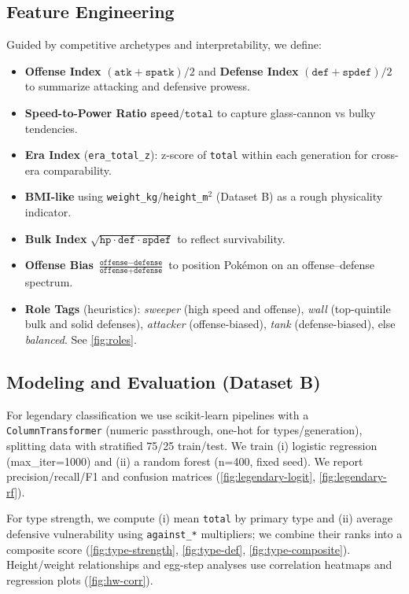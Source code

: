 \documentclass[11pt]{article}
\begin{document}
\subsection*{Feature Engineering}
Guided by competitive archetypes and interpretability, we define:
\begin{itemize}[leftmargin=*]
  \item \textbf{Offense Index} \((\texttt{atk}+\texttt{spatk})/2\) and \textbf{Defense Index} \((\texttt{def}+\texttt{spdef})/2\) to summarize attacking and defensive prowess.
  \item \textbf{Speed-to-Power Ratio} \(\texttt{speed}/\texttt{total}\) to capture glass-cannon vs bulky tendencies.
  \item \textbf{Era Index} (\texttt{era\_total\_z}): z-score of \texttt{total} within each generation for cross-era comparability.
  \item \textbf{BMI-like} using \texttt{weight\_kg}/\texttt{height\_m}\(^2\) (Dataset B) as a rough physicality indicator.
  \item \textbf{Bulk Index} \(\sqrt{\texttt{hp}\cdot\texttt{def}\cdot\texttt{spdef}}\) to reflect survivability.
  \item \textbf{Offense Bias} \(\frac{\texttt{offense}-\texttt{defense}}{\texttt{offense}+\texttt{defense}}\) to position Pokémon on an offense--defense spectrum.
  \item \textbf{Role Tags} (heuristics): \emph{sweeper} (high speed and offense), \emph{wall} (top-quintile bulk and solid defenses), \emph{attacker} (offense-biased), \emph{tank} (defense-biased), else \emph{balanced}. See \autoref{fig:roles}.
\end{itemize}

\subsection*{Modeling and Evaluation (Dataset B)}
For legendary classification we use scikit-learn pipelines with a \texttt{ColumnTransformer} (numeric passthrough, one-hot for types/generation), splitting data with stratified 75/25 train/test. We train (i) logistic regression (max\_iter=1000) and (ii) a random forest (n=400, fixed seed). We report precision/recall/F1 and confusion matrices (\autoref{fig:legendary-logit}, \autoref{fig:legendary-rf}).

For type strength, we compute (i) mean \texttt{total} by primary type and (ii) average defensive vulnerability using \texttt{against\_*} multipliers; we combine their ranks into a composite score (\autoref{fig:type-strength}, \autoref{fig:type-def}, \autoref{fig:type-composite}). Height/weight relationships and egg-step analyses use correlation heatmaps and regression plots (\autoref{fig:hw-corr}).
\end{document}

